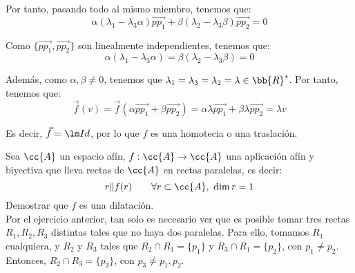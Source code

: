 \begin{ejercicio}
\begin{itemize}
        Por tanto, pasando todo al mismo miembro, tenemos que:
        \begin{equation*}
            \alpha\left(\lambda_1-\lambda_3\alpha\right) \vec{pp_1} + \beta\left(\lambda_2-\lambda_3\beta\right) \vec{pp_2} = 0
        \end{equation*}

        Como $\{\vec{pp_1}, \vec{pp_2}\}$ son linealmente independientes, tenemos que:
        \begin{equation*}
            \alpha\left(\lambda_1-\lambda_3\alpha\right) = \beta\left(\lambda_2-\lambda_3\beta\right) = 0
        \end{equation*}

        Además, como $\alpha,\beta\neq 0$, tenemos que $\lambda_1=\lambda_3=\lambda_2=\lambda\in \bb{R}^\ast$.
        Por tanto, tenemos que:
        \begin{equation*}
            \vec{f}(v) = \vec{f}\left(\alpha \vec{pp_1} + \beta \vec{pp_2}\right)
            = \alpha \lambda \vec{pp_1} + \beta \lambda \vec{pp_2} = \lambda v
        \end{equation*}

        Es decir, $\vec{f}=\lm Id$, por lo que $f$ es una homotecia o una traslación.
    \end{itemize}
\end{ejercicio}

\begin{ejercicio}
    Sea $\cc{A}$ un espacio afín, $f:\cc{A}\to \cc{A}$ una aplicación afín y biyectiva que lleva rectas de $\cc{A}$ en rectas paralelas, es decir:
    \begin{equation*}
        r\|f(r) \qquad \forall r\subset \cc{A},~ \dim r =1
    \end{equation*}
    Demostrar que $f$ es una dilatación.\\

    Por el ejercicio anterior, tan solo es necesario ver que es posible tomar tres rectas
    $R_1,R_2,R_3$ distintas tales que no haya dos paralelas.
    Para ello, tomamos $R_1$ cualquiera, y $R_2$ y $R_3$ tales que $R_2\cap R_1 = \{p_1\}$ y
    $R_3\cap R_1 = \{p_2\}$, con $p_1\neq p_2$. Entonces, $R_2\cap R_3 = \{p_3\}$, con $p_3\neq p_1,p_2$.
\end{ejercicio}

